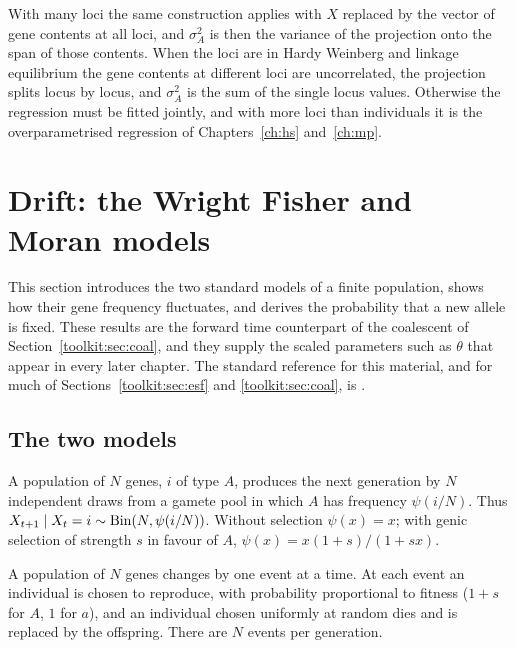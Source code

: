 With many loci the same construction applies with $X$ replaced by the vector of gene contents at
all loci, and $\sigma^2_A$ is then the variance of the projection onto the span of those
contents. When the loci are in Hardy Weinberg and linkage equilibrium the gene contents at
different loci are uncorrelated, the projection splits locus by locus, and $\sigma^2_A$ is the
sum of the single locus values. Otherwise the regression must be fitted jointly, and with more
loci than individuals it is the overparametrised regression of Chapters~\ref{ch:hs}
and~\ref{ch:mp}.

\section{Drift: the Wright Fisher and Moran models}\label{toolkit:sec:drift}

This section introduces the two standard models of a finite population, shows how their gene
frequency fluctuates, and derives the probability that a new allele is fixed. These results are
the forward time counterpart of the coalescent of Section~\ref{toolkit:sec:coal}, and they supply
the scaled parameters such as $\theta$ that appear in every later chapter. The standard reference for this
material, and for much of Sections~\ref{toolkit:sec:esf} and \ref{toolkit:sec:coal}, is
\citet{toolkit:ewens2004}.

\subsection{The two models}\label{toolkit:sec:wfmoran}

\begin{definition}\label{toolkit:def:wf}
A population of $N$ genes, $i$ of type $A$, produces the next generation by $N$ independent draws
from a gamete pool in which $A$ has frequency $\psi(i/N)$. Thus
$X_{t+1}\mid X_t=i\sim\mathrm{Bin}(N,\psi(i/N))$. Without selection $\psi(x)=x$; with genic selection of
strength $s$ in favour of $A$, $\psi(x)=x(1+s)/(1+sx)$.
\end{definition}

\begin{definition}\label{toolkit:def:moran}
A population of $N$ genes changes by one event at a time. At each event an individual is chosen
to reproduce, with probability proportional to fitness ($1+s$ for $A$, $1$ for $a$), and an
individual chosen uniformly at random dies and is replaced by the offspring. There are $N$
events per generation.
\end{definition}

